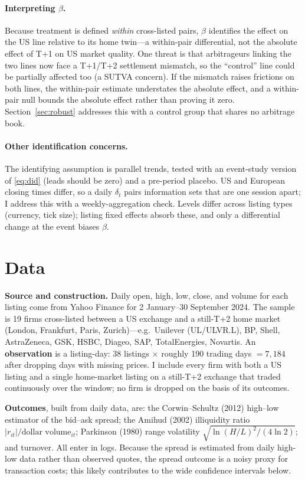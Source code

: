 \documentclass[11pt]{article}
\begin{document}
\paragraph{Interpreting $\beta$.}
Because treatment is defined \emph{within} cross-listed pairs, $\beta$ identifies
the effect on the US line relative to its home twin---a within-pair
differential, not the absolute effect of T+1 on US market quality. One threat is that arbitrageurs linking the two lines now face a T+1/T+2
settlement mismatch, so the ``control'' line could be partially affected too
(a SUTVA concern). If the mismatch raises frictions on both lines, the within-pair estimate understates the absolute
effect, and a within-pair null bounds the absolute effect rather than proving it
zero. Section~\ref{sec:robust} addresses this with a control group that
shares no arbitrage book.

\paragraph{Other identification concerns.} The identifying assumption is parallel
trends, tested with an event-study version of \eqref{eq:did} (leads should be
zero) and a pre-period placebo. US and European closing times differ, so a daily
$\delta_t$ pairs information sets that are one session apart; I address this with a
weekly-aggregation check. Levels differ across listing types (currency, tick
size); listing fixed effects absorb these, and only a differential change at the
event biases $\beta$.

\section{Data}
\textbf{Source and construction.} Daily open, high, low, close, and volume for each
listing come from Yahoo Finance for 2 January--30 September 2024. The sample is 19
firms cross-listed between a US exchange and a still-T+2 home market (London,
Frankfurt, Paris, Zurich)---e.g.\ Unilever (UL/ULVR.L), BP, Shell, AstraZeneca,
GSK, HSBC, Diageo, SAP, TotalEnergies, Novartis. An \textbf{observation} is a
listing-day: 38 listings $\times$ roughly 190 trading days $= 7{,}184$ after
dropping days with missing prices. I include every firm with both a US listing and a single home-market listing on a
still-T+2 exchange that traded continuously over the window; no firm is dropped on
the basis of its outcomes.

\textbf{Outcomes}, built from daily data, are: the Corwin--Schultz (2012) high--low
estimator of the bid--ask spread; the Amihud (2002) illiquidity ratio
$|r_{it}|/\text{dollar volume}_{it}$; Parkinson (1980) range volatility
$\sqrt{\ln(H/L)^2/(4\ln 2)}$; and turnover. All enter in logs. Because the spread is estimated from daily high-low data rather than observed quotes, the spread outcome is a noisy proxy for transaction costs; this likely contributes to the wide confidence intervals below.
\end{document}
